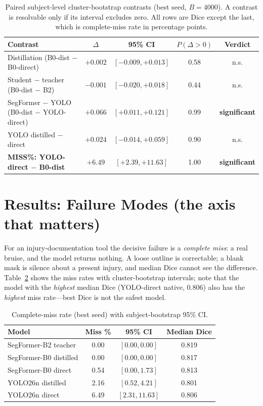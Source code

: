 \documentclass[11pt]{article}
\newcommand{\sig}{\textcolor{red!70!black}{\textbf{significant}}}
\newcommand{\ns}{n.s.}
\begin{document}
\begin{table}[h]
\centering
\caption{Paired subject-level cluster-bootstrap contrasts (best seed, $B=4000$).
A contrast is resolvable only if its interval excludes zero. All rows are Dice
except the last, which is complete-miss rate in percentage points.}
\label{tab:paired}
\begin{tabular}{lcccc}
\toprule
Contrast & $\Delta$ & 95\% CI & $P(\Delta{>}0)$ & Verdict \\
\midrule
Distillation (B0-dist $-$ B0-direct) & $+0.002$ & $[-0.009, +0.013]$ & 0.58 & \ns \\
Student $-$ teacher (B0-dist $-$ B2) & $-0.001$ & $[-0.020, +0.018]$ & 0.44 & \ns \\
SegFormer $-$ YOLO (B0-dist $-$ YOLO-direct) & $+0.066$ & $[+0.011, +0.121]$ & 0.99 & \sig \\
YOLO distilled $-$ direct & $+0.024$ & $[-0.014, +0.059]$ & 0.90 & \ns \\
\textbf{MISS\%: YOLO-direct $-$ B0-dist} & $+6.49$ & $[+2.39, +11.63]$ & 1.00 & \sig \\
\bottomrule
\end{tabular}
\end{table}

\section{Results: Failure Modes (the axis that matters)}
For an injury-documentation tool the decisive failure is a \emph{complete miss}:
a real bruise, and the model returns nothing. A loose outline is correctable; a
blank mask is silence about a present injury, and median Dice cannot see the
difference. Table~\ref{tab:miss} shows the miss rates with cluster-bootstrap
intervals; note that the model with the \emph{highest} median Dice
(YOLO-direct native, 0.806) also has the \emph{highest} miss rate---best Dice is
not the safest model.

\begin{table}[h]
\centering
\caption{Complete-miss rate (best seed) with subject-bootstrap 95\% CI.}
\label{tab:miss}
\begin{tabular}{lccc}
\toprule
Model & Miss \% & 95\% CI & Median Dice \\
\midrule
SegFormer-B2 teacher    & 0.00 & $[0.00, 0.00]$ & 0.819 \\
SegFormer-B0 distilled  & 0.00 & $[0.00, 0.00]$ & 0.817 \\
SegFormer-B0 direct     & 0.54 & $[0.00, 1.73]$ & 0.813 \\
YOLO26n distilled       & 2.16 & $[0.52, 4.21]$ & 0.801 \\
YOLO26n direct          & 6.49 & $[2.31, 11.63]$ & 0.806 \\
\bottomrule
\end{tabular}
\end{table}
\end{document}
